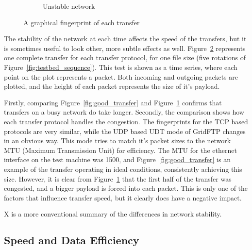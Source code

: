 \documentclass{sig-alternate-05-2015}
\begin{document}
\begin{figure}
\begin{subfigure}{.4\textwidth}
	\caption{Unstable network}
	\label{fig:bad_transfer}
	\end{subfigure}
\caption{A graphical fingerprint of each transfer}
\label{fig:packets}
\end{figure}

The stability of the network at each time affects the speed of the transfers, but it is sometimes useful to look other, more subtle effects as well. Figure~\ref{fig:packets} represents  one complete transfer for each transfer protocol, for one file size (five rotations of Figure~\ref{fig:testbed_sequence}). This test is shown as a time series, where each point on the plot represents a packet. Both incoming and outgoing packets are plotted, and the height of each packet represents the size of it's payload.

Firstly, comparing Figure~\ref{fig:good_transfer} and Figure~\ref{fig:bad_transfer} confirms that transfers on a busy network do take longer. Secondly, the comparison shows how each transfer protocol handles the congestion. The fingerprints for the TCP based protocols are very similar, while the UDP based UDT mode of GridFTP changes in an obvious way. This mode tries to match it's packet sizes to the network MTU (Maximum Transmission Unit) for efficiency. The MTU for the ethernet interface on the test machine was 1500, and Figure~\ref{fig:good_transfer} is an example of the transfer operating in ideal conditions, consistently achieving this size. However, it is clear from Figure~\ref{fig:bad_transfer} that the first half of the transfer was congested, and a bigger payload is forced into each packet. This is only one of the factors that influence transfer speed, but it clearly does have a negative impact.

X is a more conventional summary of the differences in network stability.

\subsection{Speed and Data Efficiency}
\end{document}
